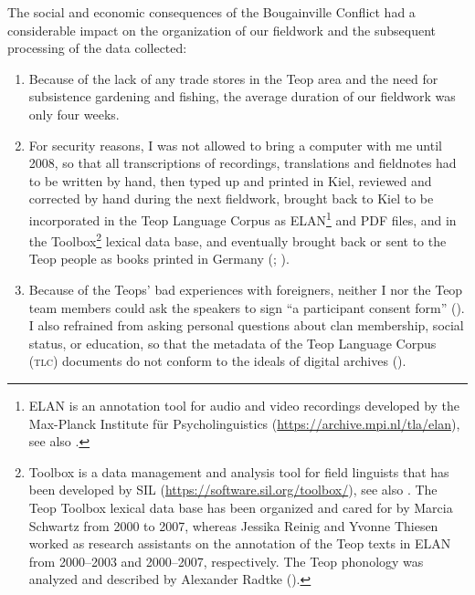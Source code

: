 \documentclass[output=paper]{langscibook}
\begin{document}
The social and economic consequences of the Bougainville Conflict had a considerable impact on the organization of our fieldwork and the subsequent processing of the data collected:
\begin{enumerate}
    \item Because of the lack of any trade stores in the Teop area and the need for subsistence gardening and fishing, the average duration of our fieldwork was only four weeks.
    \item For security reasons, I was not allowed to bring a computer with me until 2008, so that all transcriptions of recordings, translations and fieldnotes had to be written by hand, then typed up and printed in Kiel, reviewed and corrected by hand during the next fieldwork, brought back to Kiel to be incorporated in the Teop Language Corpus as ELAN\footnote{ELAN is an annotation tool for audio and video recordings developed by the Max-Planck Institute für Psycholinguistics (\url{https://archive.mpi.nl/tla/elan}), see also \textcite[102-105]{Barth:2022kc}.} and PDF files, and in the Toolbox\footnote{Toolbox is a data management and analysis tool for field linguists that has been developed by SIL (\url{https://software.sil.org/toolbox/}), see also \textcite[177]{Meakins:2018bj}. The Teop Toolbox lexical data base has been organized and cared for by Marcia Schwartz from 2000 to 2007, whereas Jessika Reinig and Yvonne Thiesen worked as research assistants on the annotation of the Teop texts in ELAN from 2000--2003 and 2000--2007, respectively. The Teop phonology was analyzed and described by Alexander Radtke (\citeyear{Radtke:2005kw}).} lexical data base, and eventually brought back or sent to the Teop people as books printed in Germany (\cite{Mosel:2007qo}; \cite{Mahaka:2010kk}).
    \item Because of the Teops’ bad experiences with foreigners, neither I nor the Teop team members could ask the speakers to sign ``a participant consent form'' (\cite[37--38]{Meakins:2018bj}). I also refrained from asking personal questions about clan membership, social status, or education, so that the metadata of the Teop Language Corpus (\textsc{tlc}) documents do not conform to the ideals of digital archives (\cite[76]{Meakins:2018bj}).
\end{enumerate}
\end{document}
